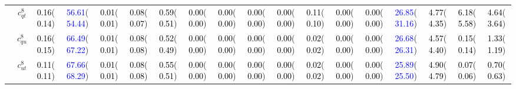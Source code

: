 \documentclass{article}
\begin{document}
\begin{landscape}
\begin{table}[H]
\begin{tabular}{|c|c|c|c|c|c|c|c|c|c|c|c|c|c|c|c|c|c|}
 & $c_{qt}^{8}$ & \textcolor{black}{0.16}(\textcolor{black}{0.14}) & \textcolor{blue}{56.61}(\textcolor{blue}{54.44}) & \textcolor{black}{0.01}(\textcolor{black}{0.01}) & \textcolor{black}{0.08}(\textcolor{black}{0.07}) & \textcolor{black}{0.59}(\textcolor{black}{0.51}) & \textcolor{black}{0.00}(\textcolor{black}{0.00}) & \textcolor{black}{0.00}(\textcolor{black}{0.00}) & \textcolor{black}{0.00}(\textcolor{black}{0.00}) & \textcolor{black}{0.00}(\textcolor{black}{0.00}) & \textcolor{black}{0.11}(\textcolor{black}{0.10}) & \textcolor{black}{0.00}(\textcolor{black}{0.00}) & \textcolor{black}{0.00}(\textcolor{black}{0.00}) & \textcolor{blue}{26.85}(\textcolor{blue}{31.16}) & \textcolor{black}{4.77}(\textcolor{black}{4.35}) & \textcolor{black}{6.18}(\textcolor{black}{5.58}) & \textcolor{black}{4.64}(\textcolor{black}{3.64})\\ \cline{2-18}
 & $c_{qu}^{8}$ & \textcolor{black}{0.16}(\textcolor{black}{0.15}) & \textcolor{blue}{66.49}(\textcolor{blue}{67.22}) & \textcolor{black}{0.01}(\textcolor{black}{0.01}) & \textcolor{black}{0.08}(\textcolor{black}{0.08}) & \textcolor{black}{0.52}(\textcolor{black}{0.49}) & \textcolor{black}{0.00}(\textcolor{black}{0.00}) & \textcolor{black}{0.00}(\textcolor{black}{0.00}) & \textcolor{black}{0.00}(\textcolor{black}{0.00}) & \textcolor{black}{0.00}(\textcolor{black}{0.00}) & \textcolor{black}{0.02}(\textcolor{black}{0.02}) & \textcolor{black}{0.00}(\textcolor{black}{0.00}) & \textcolor{black}{0.00}(\textcolor{black}{0.00}) & \textcolor{blue}{26.68}(\textcolor{blue}{26.31}) & \textcolor{black}{4.57}(\textcolor{black}{4.40}) & \textcolor{black}{0.15}(\textcolor{black}{0.14}) & \textcolor{black}{1.33}(\textcolor{black}{1.19})\\ \cline{2-18}
 & $c_{ut}^{8}$ & \textcolor{black}{0.11}(\textcolor{black}{0.11}) & \textcolor{blue}{67.66}(\textcolor{blue}{68.29}) & \textcolor{black}{0.01}(\textcolor{black}{0.01}) & \textcolor{black}{0.08}(\textcolor{black}{0.08}) & \textcolor{black}{0.55}(\textcolor{black}{0.51}) & \textcolor{black}{0.00}(\textcolor{black}{0.00}) & \textcolor{black}{0.00}(\textcolor{black}{0.00}) & \textcolor{black}{0.00}(\textcolor{black}{0.00}) & \textcolor{black}{0.00}(\textcolor{black}{0.00}) & \textcolor{black}{0.02}(\textcolor{black}{0.02}) & \textcolor{black}{0.00}(\textcolor{black}{0.00}) & \textcolor{black}{0.00}(\textcolor{black}{0.00}) & \textcolor{blue}{25.89}(\textcolor{blue}{25.50}) & \textcolor{black}{4.90}(\textcolor{black}{4.79}) & \textcolor{black}{0.07}(\textcolor{black}{0.06}) & \textcolor{black}{0.70}(\textcolor{black}{0.63})\\ \hline

\end{tabular}
\end{table}
\end{landscape}
\end{document}
